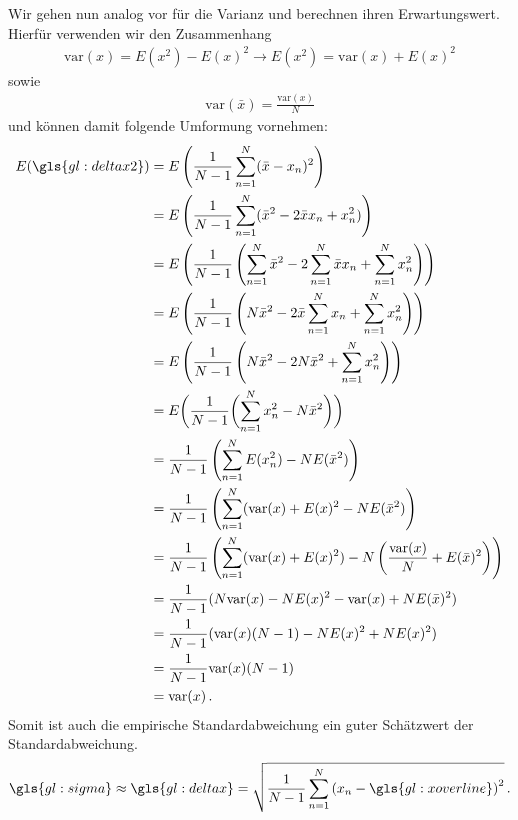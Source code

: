 Wir gehen nun analog vor für die Varianz und berechnen ihren Erwartungswert. Hierfür verwenden wir den Zusammenhang
\begin{align}
\text{var}(x) = E(x^2) - E(x)^2 \rightarrow E(x^2) = \text{var}(x) + E(x)^2
\end{align}
sowie
\begin{align}
\text{var}(\bar{x}) = \frac{\text{var}(x)}{N} 
\end{align}
und können damit folgende Umformung vornehmen: 
\begin{align}
\begin{split}
E(\gls{gl:deltax2}) &= E \left( \frac{1}{N-1} \sum_{n=1}^N ( \bar{x} - x_n )^2 \right)\\
&= E \left( \frac{1}{N-1} \sum_{n=1}^N ( \bar{x}^2 - 2 \bar{x} x_n + x_n^2 ) \right)\\
&= E \left( \frac{1}{N-1} \left( \sum_{n=1}^N \bar{x}^2 - 2 \sum_{n=1}^N \bar{x} x_n + \sum_{n=1}^N x_n^2 \right) \right)\\
&= E \left( \frac{1}{N-1} \left( N \bar{x}^2 - 2 \bar{x} \sum_{n=1}^N x_n + \sum_{n=1}^N x_n^2 \right) \right)\\
& = E \left( \frac{1}{N-1} \left( N \bar{x}^2 - 2 N \bar{x}^2 + \sum_{n=1}^N x_n^2 \right) \right)\\
&= E \biggl( \frac{1}{N-1} \biggl( \sum_{n=1}^N x_n^2 - N \bar{x}^2 \biggr) \biggr)\\
&= \frac{1}{N-1} \left( \sum_{n=1}^N E(x_n^2) - N E(\bar{x}^2) \right)\\
& = \frac{1}{N-1} \left( \sum_{n=1}^N (\text{var}(x) + E(x)^2 - N E(\bar{x}^2) \right)\\
& = \frac{1}{N-1} \left( \sum_{n=1}^N (\text{var}(x) + E(x)^2) - N \left( \frac{\text{var}(x)}{N} + E(\bar{x})^2 \right) \right)\\
&= \frac{1}{N-1} ( N \text{var}(x) - N E(x)^2 - \text{var}(x) + N E(\bar{x})^2 )\\
&= \frac{1}{N-1} (\text{var}(x) (N-1) - N E(x)^2 + N E(x)^2 ) \\
&= \frac{1}{N-1} \text{var}(x) (N-1) \\
&= \text{var}(x)\,.
\end{split}
\end{align}
Somit ist auch die empirische Standardabweichung ein guter Schätzwert der Standardabweichung.
\begin{align}
\gls{gl:sigma} \approx \gls{gl:deltax} = \sqrt{\frac{1}{N-1} \sum^N_{n = 1} \left( x_n - \gls{gl:xoverline} \right)^2}\,.
\end{align}

